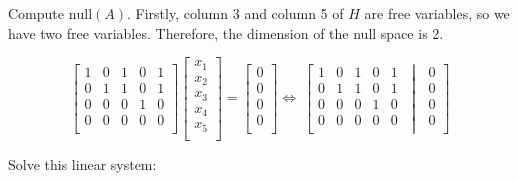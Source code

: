 \documentclass[12pt]{article}
\theoremstyle{plain}
\theoremstyle{remark}
\theoremstyle{definition}
\begin{document}
Compute \(\text{null}(A)\). Firstly, column 3 and column 5 of \(H\) are
free variables, so we have two free variables. Therefore, the dimension
of the null space is 2.

\[\begin{bmatrix}
1 & 0 & 1 & 0 & 1 \\
0 & 1 & 1 & 0 & 1 \\
0 & 0 & 0 & 1 & 0 \\
0 & 0 & 0 & 0 & 0 \\
\end{bmatrix}\begin{bmatrix}
x_{1} \\
x_{2} \\
x_{3} \\
x_{4} \\
x_{5} \\
\end{bmatrix} = \begin{bmatrix}
0 \\
0 \\
0 \\
0 \\
\end{bmatrix} \Leftrightarrow \ \left\lbrack \begin{matrix}
1 & 0 & 1 & 0 & 1 \\
0 & 1 & 1 & 0 & 1 \\
0 & 0 & 0 & 1 & 0 \\
0 & 0 & 0 & 0 & 0 \\
\end{matrix}\;\middle|\;\begin{matrix}
0 \\
0 \\
0 \\
0 \\
\end{matrix} \right\rbrack\]

Solve this linear system:
\end{document}
